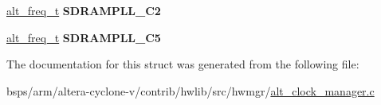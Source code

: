\begin{DoxyCompactItemize}
\item 
\mbox{\label{structALT__PLL__CNTR__FREQMAX__s_aa0b1c764798a2c1d34aa84c8939b731c}} 
\mbox{\hyperlink{group__CLK__MGR_gaa32fe6dfaa6def16098e0039eb336383}{alt\+\_\+freq\+\_\+t}} {\bfseries S\+D\+R\+A\+M\+P\+L\+L\+\_\+\+C2}
\item 
\mbox{\label{structALT__PLL__CNTR__FREQMAX__s_a2f95ab92f7dc594a90c5ee0464c4d336}} 
\mbox{\hyperlink{group__CLK__MGR_gaa32fe6dfaa6def16098e0039eb336383}{alt\+\_\+freq\+\_\+t}} {\bfseries S\+D\+R\+A\+M\+P\+L\+L\+\_\+\+C5}
\end{DoxyCompactItemize}


The documentation for this struct was generated from the following file\+:\begin{DoxyCompactItemize}
\item 
bsps/arm/altera-\/cyclone-\/v/contrib/hwlib/src/hwmgr/\mbox{\hyperlink{alt__clock__manager_8c}{alt\+\_\+clock\+\_\+manager.\+c}}\end{DoxyCompactItemize}
